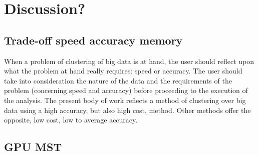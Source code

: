 \documentclass[10pt,a4paper,twoside]{report}
\begin{document}
\printglossary
\cleardoublepage

%
\setcounter{page}{1}









\chapter{Discussion?}
\label{chapter:discussion}


\section{Trade-off speed accuracy memory}

When a problem of clustering of big data is at hand, the user should reflect upon what the problem at hand really requires: speed or accuracy. The user should take into consideration the nature of the data and the requirements of the problem (concerning speed and accuracy) before proceeding to the execution of the analysis. The present body of work reflects a method of clustering over big data using a high accuracy, but also high cost, method. Other methods offer the opposite, low cost, low to average accuracy. 

\section{GPU MST}
\end{document}
